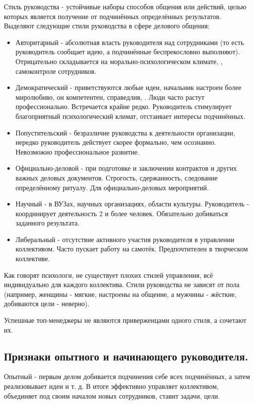 Стиль руководства - устойчивые наборы способов общения или действий, целью которых является получение от подчинённых определённых результатов. Выделяют следующие стили руководства в сфере делового общения:
\begin{itemize}
    \item Авторитарный - абсолютная власть руководителя над сотрудниками (то есть руководитель сообщает идею, а подчинённые беспрекословно выполняют). Отрицательно складывается на морально-психологическом климате, \missed{}, самоконтроле сотрудников.
    \item Демократический - приветствуются любые идеи, начальник настроен более миролюбиво, он компетентен, справедлив, \missed{}. Люди часто растут профессионально. Встречается крайне редко. Руководитель стимулирует благоприятный психологический климат, отстаивает интересы подчинённых.
    \item Попустительский - безразличие руководства к деятельности организации, нередко руководитель действует скорее формально, чем осознанно. Невозможно профессиональное развитие.
    \item Официально-деловой - при подготовке и заключении контрактов и других важных деловых документов. Строгость, сдержанность, следование определённому ритуалу. Для официально-деловых мероприятий.
    \item Научный - в ВУЗах, научных организациях, области культуры. Руководитель - координирует деятельность 2 и более человек. Обязательно добиваться заданного результата.
    \item Либеральный - отсутствие активного участия руководителя в управлении коллективом. Часто пускает работу на самотёк. Предпочтителен в творческом коллективе.
\end{itemize}

Как говорят психологи, не существует плохих стилей управления, всё индивидуально для каждого коллектива. Стили руководства не зависят от пола (например, женщины - мягкие, настроены на общение, а мужчины - жёсткие, добиваются цели - неверно).

Успешные топ-менеджеры не являются приверженцами одного стиля, а сочетают их.

\subsection{Признаки опытного и начинающего руководителя.}

Опытный - первым делом добивается подчинения себе всех подчинённых, а затем реализовывает идеи и т. д. В итоге эффективно управляет коллективом, объединяет под своим началом новых сотрудников, ставит задачи, цели.

